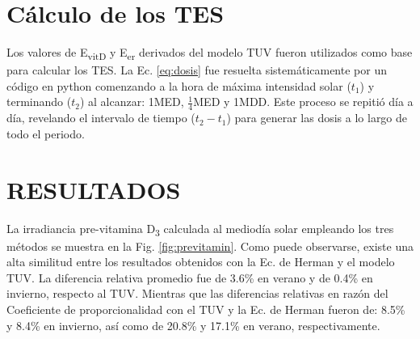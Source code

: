 \documentclass[10pt,twocolumn]{article}
\begin{document}
\section{Cálculo de los TES}
Los valores de E\textsubscript{vitD} y E\textsubscript{er} derivados del modelo TUV fueron utilizados como base para calcular los TES. La Ec. \ref{eq:dosis} fue resuelta sistemáticamente por un código en python comenzando a la hora de máxima intensidad solar ($t_1$) y terminando ($t_2$) al alcanzar: 1MED, $\frac{1}{4}$MED y 1MDD. Este proceso se repitió día a día, revelando el intervalo de tiempo ($t_2-t_1$) para generar las dosis a lo largo de todo el periodo.

\section{RESULTADOS}
La irradiancia pre-vitamina D\textsubscript{3} calculada al mediodía solar empleando los tres métodos se muestra en la Fig. \ref{fig:previtamin}. Como puede observarse, existe una alta similitud entre los resultados obtenidos con la Ec. de Herman y el modelo TUV. La diferencia relativa promedio fue de 3.6\% en verano y de 0.4\% en invierno, respecto al TUV. Mientras que las diferencias relativas en razón del Coeficiente de proporcionalidad con el TUV y la Ec. de Herman fueron de: 8.5\% y 8.4\% en invierno, así como de 20.8\% y 17.1\% en verano, respectivamente.
\end{document}
